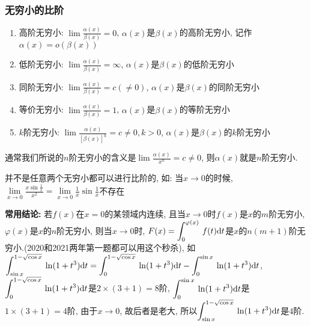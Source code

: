 \subsubsection{无穷小的比阶}\label{无穷小的比阶}
\begin{enumerate}
    \item 高阶无穷小: $ \lim\limits \frac{\alpha(x)}{\beta(x)}=0 $, $ \alpha(x) $是$ \beta(x) $的高阶无穷小, 记作$ \alpha(x)=o(\beta(x)) $
    \item 低阶无穷小: $ \lim\limits \frac{\alpha(x)}{\beta(x)}=\infty $, $ \alpha(x) $是$ \beta(x) $的低阶无穷小
    \item 同阶无穷小: $ \lim\limits \frac{\alpha(x)}{\beta(x)}=c(\neq 0) $, $ \alpha(x) $是$ \beta(x) $的同阶无穷小
    \item 等价无穷小: $ \lim\limits \frac{\alpha(x)}{\beta(x)}=1 $, $ \alpha(x) $是$ \beta(x) $的等阶无穷小
    \item $ k $阶无穷小: $ \lim\limits \frac{\alpha(x)}{[\beta(x)]^{k}}=c\neq 0, k>0 $, $ \alpha(x) $是$ \beta(x) $的$ k $阶无穷小
\end{enumerate}\par
通常我们所说的$ n $阶无穷小的含义是$ \lim\limits \frac{\alpha(x)}{x^{n}}=c\neq 0 $, 则$ \alpha(x) $就是$ n $阶无穷小.
\begin{tcolorbox}
    并不是任意两个无穷小都可以进行比阶的, 如: 当$ x \rightarrow 0 $的时候, $ \lim\limits_{x\rightarrow 0}\frac{x\sin \frac{1}{x}}{x^{2}}=\lim\limits_{x\rightarrow 0}\frac{1}{x}\sin \frac{1}{x} $不存在 \par \vspace{.5em}
    \textbf{常用结论: } 若$ f(x) $在$ x=0 $的某领域内连续, 且当$ x\rightarrow 0 $时$ f(x) $是$ x $的$ m $阶无穷小, $ \varphi(x) $是$ x $的$ n $阶无穷小, 则当$ x\rightarrow 0 $时, $ F(x)=\displaystyle\int_{0}^{\varphi(x)}\hspace{.2em}f(t)\mathrm{d}t $是$ x $的$ n(m+1) $阶无穷小.(2020和2021两年第一题都可以用这个秒杀), 如$ \displaystyle\int_{\sin x}^{1-\sqrt{\cos x}}\hspace{.2em}\ln (1+t^{3})\mathrm{d}t=\displaystyle\int_{0}^{1-\sqrt{\cos x}}\hspace{.2em}\ln(1+t^{3})\mathrm{d}t-\displaystyle\int_{0}^{\sin x}\hspace{.2em}\ln(1+t^{3})\mathrm{d}t $, $ \displaystyle\int_{0}^{1-\sqrt{\cos x}}\hspace{.2em}\ln(1+t^{3})\mathrm{d}t $是$ 2\times (3+1)=8 $阶, $ \displaystyle\int_{0}^{\sin x}\hspace{.2em}\ln(1+t^{3})\mathrm{d}t $是$ 1\times(3+1)=4 $阶, 由于$ x\rightarrow 0 $, 故后者是老大, 所以$ \displaystyle\int_{\sin x}^{1-\sqrt{\cos x}}\hspace{.2em}\ln (1+t^{3})\mathrm{d}t $是$ 4 $阶.
\end{tcolorbox}
